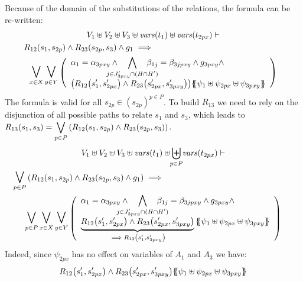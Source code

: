 \documentclass[runningheads]{llncs}
\begin{document}
\begin{enumerate}
Because of the domain of the substitutions of the relations, the formula can be re-written:
\begin{multline*}
V_1 \uplus V_2 \uplus V_3  \uplus \fvars{t_1}\uplus \fvars{t_{2px}} \vdash\\
R_{12}\mpar{s_1, s_{2p}} \wedge R_{23}\mpar{s_{2p},s_3} \wedge g_1 \implies 
\hspace{5.5cm}\\
\operatorname*{\bigsymb{\bigvee}}_{x \in X} 
\operatorname*{\bigsymb{\bigvee}}_{y \in Y}
\mpar{\everymath{\displaystyle}
\begin{array}{l}
\alpha_1=\alpha_{3pxy}\wedge \bigwedge_\subbox{j \in J'_{3pxy} \cap (H\cap H')} \beta_{1j}=\beta_{3jpxy} \wedge g_{3pxy}\wedge \\
\mpar{R_{12}\mpar{s'_1, s'_{2px}} \wedge R_{23}\mpar{s'_{2px}, s'_{3pxy}}}\psubst{\psi_1 \uplus \psi_{2px} \uplus \psi_{3pxy}}
\end{array}}
\end{multline*}
The formula is valid for all $s_{2p} \in (s_{2p})^{p\in P}$. To build $R_{13}$ we need to rely on the disjunction of all possible paths to relate $s_1$ and $s_3$, which leads to\\ ${\displaystyle R_{13}(s_1,s_3)=\bigvee_{{p\in P}}{\left(R_{12}{\left(s_1,s_{2p}\right)} \wedge R_{23}{\left(s_{2p},s_3\right)}\right)}}$.
\begin{multline*}
V_1 \uplus V_2 \uplus V_3  \uplus \fvars{t_1} \uplus  \biguplus_\subbox{p \in P} \fvars{t_{2px}} \vdash\\
\operatorname*{\bigsymb{\bigvee}}_{p\in P} \mpar{R_{12}\mpar{s_1, s_{2p}} \wedge R_{23}\mpar{s_{2p},s_3} \wedge g_1} \implies 
\hspace{5.5cm}\\
\operatorname*{\bigsymb{\bigvee}}_{p\in P}
\operatorname*{\bigsymb{\bigvee}}_{x \in X} 
\operatorname*{\bigsymb{\bigvee}}_{y \in Y}
\mpar{\everymath{\displaystyle}
\begin{array}{l}
\alpha_1=\alpha_{3pxy}\wedge \bigwedge_\subbox{j \in J'_{3pxy} \cap (H\cap H')} \beta_{1j}=\beta_{3jpxy} \wedge g_{3pxy}\wedge \\
\underbrace{R_{12}\mpar{s'_1, s'_{2px}} \wedge R_{23}\mpar{s'_{2px}, s'_{3pxy}}}_{\implies R_{13}\mpar{s'_1,s'_{3pxy}}}\psubst{\psi_1 \uplus \psi_{2px} \uplus \psi_{3pxy}}
\end{array}}
\end{multline*}
Indeed, since $\psi_{2px}$ has no effect on variables of $A_1$ and $A_3$ we have:
\begin{align*}
R_{12}\mpar{s'_1, s'_{2px}} \wedge R_{23}\mpar{s'_{2px}, s'_{3pxy}}\psubst{\psi_1 \uplus \psi_{2px} \uplus \psi_{3pxy}}  \\  

\end{align*}
\end{enumerate}
\end{document}
